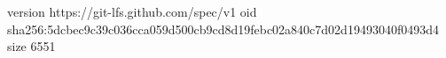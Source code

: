 version https://git-lfs.github.com/spec/v1
oid sha256:5dcbec9c39c036cca059d500cb9cd8d19febc02a840c7d02d19493040f0493d4
size 6551

